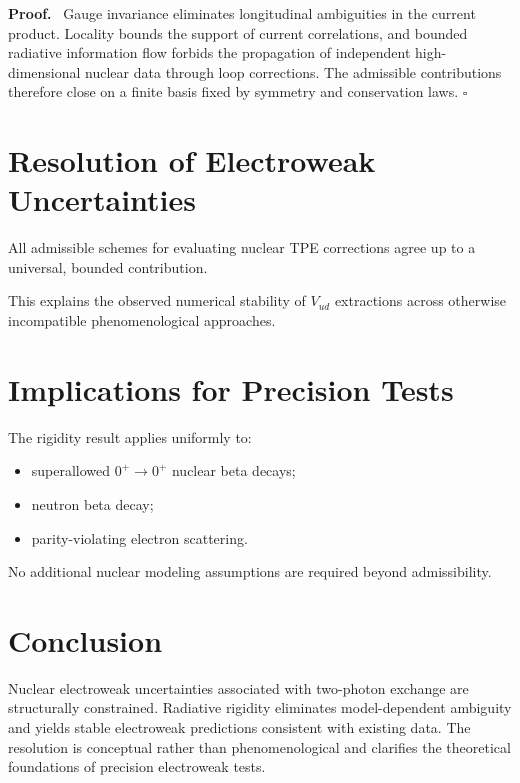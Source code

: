 \documentclass[11pt,a4paper]{article}
\newenvironment{proof}%
{\par\noindent\textbf{Proof.}\ }%
{\hfill$\square$\par\medskip}
\begin{document}
\begin{proof}
Gauge invariance eliminates longitudinal ambiguities in the current product.
Locality bounds the support of current correlations, and bounded radiative
information flow forbids the propagation of independent high-dimensional nuclear
data through loop corrections. The admissible contributions therefore close on a
finite basis fixed by symmetry and conservation laws.
\end{proof}

\section{Resolution of Electroweak Uncertainties}

\begin{corollary}
All admissible schemes for evaluating nuclear TPE corrections agree up to a
universal, bounded contribution.
\end{corollary}

\begin{remark}
This explains the observed numerical stability of $V_{ud}$ extractions across
otherwise incompatible phenomenological approaches.
\end{remark}

\section{Implications for Precision Tests}

The rigidity result applies uniformly to:
\begin{itemize}
\item superallowed $0^+\!\to0^+$ nuclear beta decays;
\item neutron beta decay;
\item parity-violating electron scattering.
\end{itemize}

No additional nuclear modeling assumptions are required beyond admissibility.

\section{Conclusion}

Nuclear electroweak uncertainties associated with two-photon exchange are
structurally constrained. Radiative rigidity eliminates model-dependent
ambiguity and yields stable electroweak predictions consistent with existing
data. The resolution is conceptual rather than phenomenological and clarifies
the theoretical foundations of precision electroweak tests.
\end{document}
